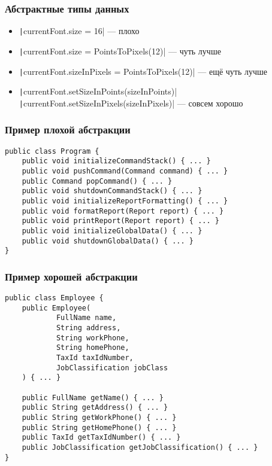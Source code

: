 \documentclass{../../slides-style}
\begin{document}
    \begin{frame}
        \frametitle{Абстрактные типы данных}
        \begin{itemize}
            \item \texttt|currentFont.size = 16| --- плохо
            \item \texttt|currentFont.size = PointsToPixels(12)| --- чуть лучше
            \item \texttt|currentFont.sizeInPixels = PointsToPixels(12)| --- ещё чуть лучше
            \item \texttt|currentFont.setSizeInPoints(sizeInPoints)| \newline
                    \texttt|currentFont.setSizeInPixels(sizeInPixels)| --- совсем хорошо
        \end{itemize}
    \end{frame}

    \begin{frame}[fragile]
        \frametitle{Пример плохой абстракции}
        \begin{verbatim}
public class Program {
    public void initializeCommandStack() { ... }
    public void pushCommand(Command command) { ... }
    public Command popCommand() { ... }
    public void shutdownCommandStack() { ... }
    public void initializeReportFormatting() { ... }
    public void formatReport(Report report) { ... }
    public void printReport(Report report) { ... }
    public void initializeGlobalData() { ... }
    public void shutdownGlobalData() { ... }
}
        \end{verbatim}
\end{frame}

    \begin{frame}[fragile]
        \frametitle{Пример хорошей абстракции}
        \begin{footnotesize}
            \begin{verbatim}
public class Employee {
    public Employee(
            FullName name,
            String address,
            String workPhone,
            String homePhone,
            TaxId taxIdNumber,
            JobClassification jobClass
    ) { ... }

    public FullName getName() { ... }
    public String getAddress() { ... }
    public String getWorkPhone() { ... }
    public String getHomePhone() { ... }
    public TaxId getTaxIdNumber() { ... }
    public JobClassification getJobClassification() { ... }
}
            \end{verbatim}
        \end{footnotesize}
    \end{frame}
\end{document}
